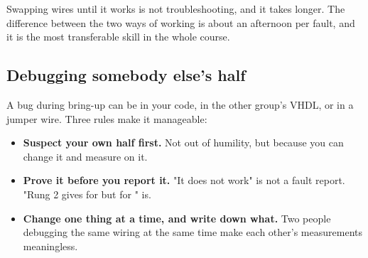 \begin{aside}
\note Swapping wires until it works is not troubleshooting, and it takes longer. The difference
between the two ways of working is about an afternoon per fault, and it is the most transferable
skill in the whole course.
\end{aside}

\subsection{Debugging somebody else's half}

A bug during bring-up can be in your code, in the other group's VHDL, or in a jumper wire. Three
rules make it manageable:

\begin{itemize}
  \item \textbf{Suspect your own half first.} Not out of humility, but because you can change it
    and measure on it.
  \item \textbf{Prove it before you report it.} "It does not work" is not a fault report. "Rung 2
    gives  for  but  for " is.
  \item \textbf{Change one thing at a time, and write down what.} Two people debugging the same
    wiring at the same time make each other's measurements meaningless.
\end{itemize}
